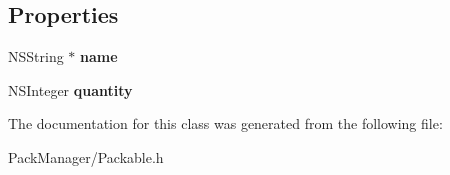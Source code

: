\subsection*{Properties}
\begin{DoxyCompactItemize}
\item 
\hypertarget{interface_packable_ac796b857c15e96bfe0cab64d4f855b8d}{N\-S\-String $\ast$ {\bfseries name}}\label{interface_packable_ac796b857c15e96bfe0cab64d4f855b8d}

\item 
\hypertarget{interface_packable_a1bcccd6d856e10d677a6ba2c86f87768}{N\-S\-Integer {\bfseries quantity}}\label{interface_packable_a1bcccd6d856e10d677a6ba2c86f87768}

\end{DoxyCompactItemize}


The documentation for this class was generated from the following file\-:\begin{DoxyCompactItemize}
\item 
Pack\-Manager/Packable.\-h\end{DoxyCompactItemize}
